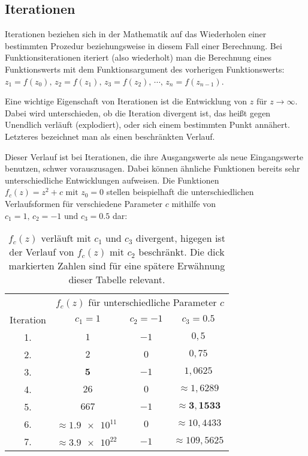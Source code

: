 \subsection{Iterationen}\label{subsec:iterations}

Iterationen beziehen sich in der Mathematik auf das Wiederholen einer bestimmten
Prozedur beziehungsweise in diesem Fall einer Berechnung.
Bei Funktionsiterationen iteriert (also wiederholt) man die Berechnung eines
Funktionswerts mit dem Funktionsargument des vorherigen Funktionswerts:
$z_1 = f(z_0),\, z_2 = f(z_1),\, z_3 = f(z_2),\, \cdots,\, z_n = f(z_{n-1})$.

Eine wichtige Eigenschaft von Iterationen ist die Entwicklung von
$z \text{ für } z \to \infty$.
Dabei wird unterschieden, ob die Iteration divergent ist,
das heißt gegen Unendlich verläuft (\glqq explodiert\grqq),
oder sich einem bestimmten Punkt annähert.
Letzteres bezeichnet man als einen beschränkten Verlauf.

Dieser Verlauf ist bei Iterationen, die ihre Ausgangswerte als neue Eingangswerte
benutzen, schwer vorauszusagen.
Dabei können ähnliche Funktionen bereits sehr unterschiedliche Entwicklungen aufweisen.
Die Funktionen $f_c(z) = z^2 + c \text{ mit } z_0 = 0$ stellen beispielhaft
die unterschiedlichen Verlaufsformen für verschiedene Parameter $c$ mithilfe von
$c_1 = 1 \text{, } c_2 = -1 \text{ und } c_3 = 0.5$ dar:

\begin{table}[h!]
  \centering
  \begin{tabular}{@{}cccc@{}}
    \toprule
    & \multicolumn{3}{c}{$f_c(z)$ für unterschiedliche Parameter $c$} \\
    \cmidrule(lr){2-4}
    Iteration & $ c_1 = 1$ & $ c_2 = -1$ & $ c_3 = 0.5$ \\
    \midrule
    1. & $1$ & $-1$ & $0,5$ \\
    2. & $2$ & $0$ & $0,75$ \\
    3. & $\boldsymbol{5}$ & $-1$ & $1,0625$ \\
    4. & $26$ & $0$ & $\approx 1,6289 $ \\
    5. & $667$ & $-1$ & $\approx \boldsymbol{3,1533} $ \\
    6. & $\approx \num{1,9e11}\ $ & $0$ & $\approx 10,4433 $ \\
    7. & $\approx \num{3,9e22}\ $ & $-1$ & $\approx 109,5625 $ \\
    \bottomrule
  \end{tabular}
  \caption{
    $f_c(z) \text{ verläuft mit } c_1 \text{ und } c_3$ divergent,
    higegen ist der Verlauf von $f_c(z) \text{ mit } c_2$ beschränkt.
    Die dick markierten Zahlen sind für eine spätere Erwähnung dieser Tabelle
    relevant.
  }
  \label{tab:iterations-example}
\end{table}